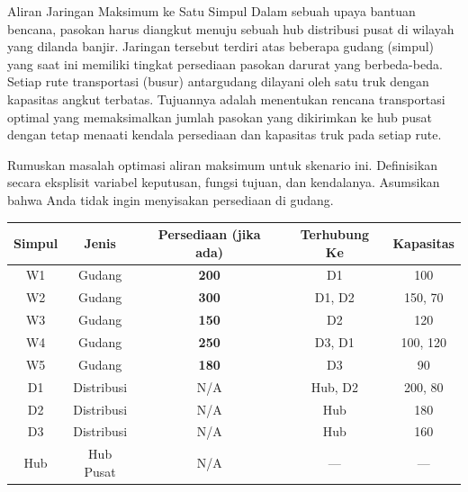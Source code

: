 \begin{ex}{Aliran Jaringan Maksimum ke Satu Simpul}{}
\label{ex:relief-max-flow}
 Dalam sebuah upaya bantuan bencana, pasokan harus diangkut menuju sebuah hub distribusi pusat di wilayah yang dilanda banjir. Jaringan tersebut terdiri atas beberapa gudang (simpul) yang saat ini memiliki tingkat persediaan pasokan darurat yang berbeda-beda. Setiap rute transportasi (busur) antargudang dilayani oleh satu truk dengan kapasitas angkut terbatas. Tujuannya adalah menentukan rencana transportasi optimal yang memaksimalkan jumlah pasokan yang dikirimkan ke hub pusat dengan tetap menaati kendala persediaan dan kapasitas truk pada setiap rute.

Rumuskan masalah optimasi aliran maksimum untuk skenario ini. Definisikan secara eksplisit variabel keputusan, fungsi tujuan, dan kendalanya. Asumsikan bahwa Anda tidak ingin menyisakan persediaan di gudang.

    \begin{tabular}{|c|c|c|c|c|}
        \hline
        \textbf{Simpul} & \textbf{Jenis} & \textbf{Persediaan (jika ada)} & \textbf{Terhubung Ke} & \textbf{Kapasitas} \\
        \hline
        W1 & Gudang & \textbf{200} & D1 & 100 \\
        W2 & Gudang & \textbf{300} & D1, D2 & 150, 70 \\
        W3 & Gudang & \textbf{150} & D2 & 120 \\
        W4 & Gudang & \textbf{250} & D3, D1 & 100, 120 \\
        W5 & Gudang & \textbf{180} & D3 & 90 \\
        \hline
        D1 & Distribusi & N/A & Hub, D2 & 200, 80 \\
        D2 & Distribusi & N/A & Hub & 180 \\
        D3 & Distribusi & N/A & Hub & 160 \\
        \hline
        Hub & Hub Pusat & N/A & --- & --- \\
        \hline
    \end{tabular}
\par{}\label{tab:modeling-sums-continued-tab04}%

    
\begin{center}
\begin{tikzpicture}[
    node distance=1.5cm and 2.5cm,
    warehouse/.style={draw, rectangle, minimum size=1.2cm, font=\small},
    distribution/.style={draw, circle, minimum size=1.2cm, font=\small},
    hub/.style={draw,  diamond, minimum size=1.2cm, font=\small}]


\end{tikzpicture}
\end{center}
\end{ex}
